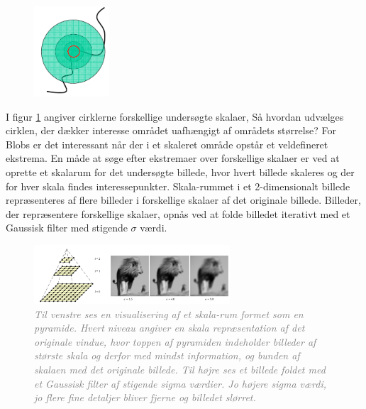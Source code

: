 \begin{figure}[H]
    \centering
    \includegraphics[width=0.25\textwidth]{fig/29.png}
    \vspace{-0.5em}   
    \begin{center}
    \caption{\textcolor{gray}{\footnotesize \textit{
    }}}
    \label{fig:scale}
     \end{center}
  \end{figure}
       \vspace{-2.5em}
\noindent
I figur \ref{fig:scale} angiver cirklerne forskellige undersøgte skalaer, Så hvordan udvælges cirklen, der dækker interesse området uafhængigt af områdets størrelse?  For Blobs er det interessant når der i et skaleret område opstår et veldefineret ekstrema. En måde at søge efter ekstremaer over forskellige skalaer er ved at oprette et skalarum for det undersøgte billede, hvor hvert billede skaleres og der for hver skala findes interessepunkter. Skala-rummet i et 2-dimensionalt billede repræsenteres af flere billeder i forskellige skalaer af det originale billede. Billeder, der repræsentere forskellige skalaer, opnås ved at folde billedet iterativt med et Gaussisk filter med stigende $\sigma$ værdi. 
\begin{figure}[H]
    \centering
    \includegraphics[width=0.65\textwidth]{fig/24.png}
    \vspace{-0.5em}   
    \begin{center}
    \caption{\textcolor{gray}{\footnotesize \textit{
Til venstre ses en visualisering af et skala-rum formet som en pyramide. Hvert niveau angiver en skala repræsentation af det originale vindue, hvor toppen af pyramiden indeholder billeder af største skala og derfor med mindst information, og bunden af skalaen med det originale billede. Til højre ses et billede foldet med et Gaussisk filter af stigende sigma værdier. Jo højere sigma værdi, jo flere fine detaljer bliver fjerne og billedet slørret.
    }}}
    \label{fig:mona}
     \end{center}
  \end{figure}
